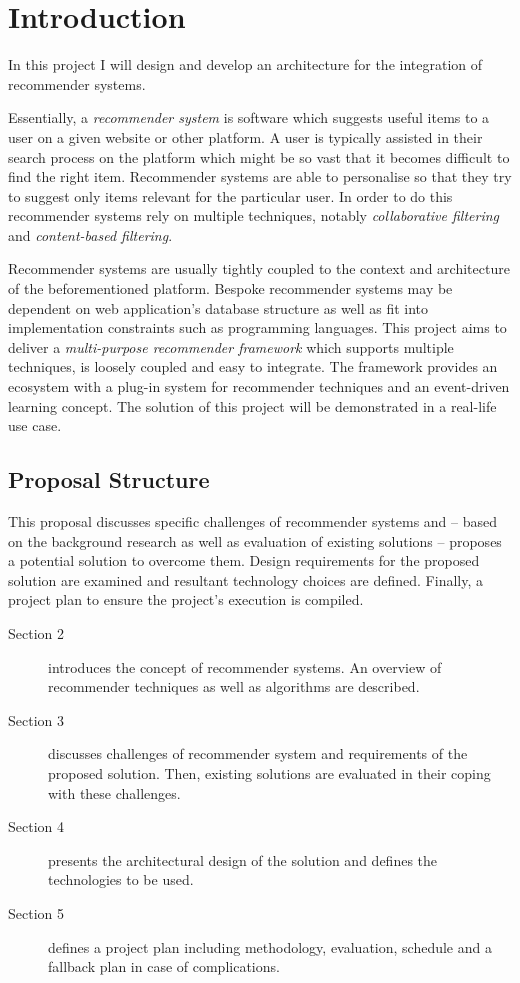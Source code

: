 \chapter{Introduction}

In this project I will design and develop an architecture for the integration of recommender systems.

Essentially, a \emph{recommender system} is software which suggests useful items to a user on a given website or other platform. A user is typically assisted in their search process on the platform which might be so vast that it becomes difficult to find the right item. Recommender systems are able to personalise so that they try to suggest only items relevant for the particular user. In order to do this recommender systems rely on multiple techniques, notably \emph{collaborative filtering} and \emph{content-based filtering}.

Recommender systems are usually tightly coupled to the context and architecture of the beforementioned platform. Bespoke recommender systems may be dependent on web application's database structure as well as fit into implementation constraints such as programming languages. This project aims to deliver a \emph{multi-purpose recommender framework} which supports multiple techniques, is loosely coupled and easy to integrate. The framework provides an ecosystem with a plug-in system for recommender techniques and an event-driven learning concept. The solution of this project will be demonstrated in a real-life use case.

\section{Proposal Structure}

This proposal discusses specific challenges of recommender systems and -- based on the background research as well as evaluation of existing solutions -- proposes a potential solution to overcome them. Design requirements for the proposed solution are examined and resultant technology choices are defined. Finally, a project plan to ensure the project's execution is compiled.

\begin{description}
    \item[Section 2] introduces the concept of recommender systems. An overview of recommender techniques as well as algorithms are described.
    \item[Section 3] discusses challenges of recommender system and requirements of the proposed solution. Then, existing solutions are evaluated in their coping with these challenges.
    \item[Section 4] presents the architectural design of the solution and defines the technologies to be used.
    \item[Section 5] defines a project plan including methodology, evaluation, schedule and a fallback plan in case of complications.
\end{description}